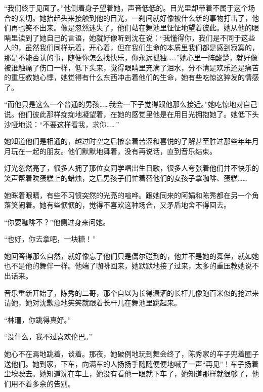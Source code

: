 \par “我们终于见面了。”他侧着身子望着她，声音低低的。目光里却带着不属于这个场合的亲切。她抬起头来接触到他的目光，一刹间就好像被什么新的事物打击了，他们再也笑不出来。像是忽然迷失了，他们站在舞池里怔怔地望着彼此。她从他的眼睛里读到了她自己的言语，她就好像听到沈在说：“我懂得你，我们是不同于这些人的，虽然我们同样玩着，开心着，但在我们生命的本质里我们都是感到寂寞的，那是不能否认的事，随便你怎么找快乐，你永远孤独……”她心里一阵酸楚，就好像被谁触痛了伤口一样，低下头来，觉得眼睛里充满了泪水，分不清是欢乐还是痛苦的重压教她心悸，她觉得有什么东西冲击着他们的生命，她有些吃惊这猝发的情感了。
\par “而他只是这么一个普通的男孩……我会一下子觉得跟他那么接近。”她吃惊地对自己说。他们彼此那样痴痴地凝望着，在她的感觉里他是在用目光拥抱她了。她低下头沙哑地说：“不要这样看我，求你……”
\par 她知道他们是相通的，越过时空之后掺杂着苦涩和喜悦的了解甚至胜过那些年年月月玩在一起的朋友。他们默默地舞着，没有再说话，直到音乐结束。
\par 灯光忽然亮了，很多人拥了那位女同学唱出生日歌，很多人夸张着他们并不快乐的笑声帮着吹蛋糕上的蜡烛，之后男孩子们忙着替他们的女孩子拿咖啡、蛋糕……
\par 她眯着眼睛，有些不习惯突然的光亮的喧哗。跟她同来的阿娟和陈秀都在另一个角落笑闹着。她有些恹恹的，觉得不喜欢这种场合，又矛盾地舍不得回去。
\par “你要咖啡不？”他侧过身来问她。
\par “也好，你去拿吧，一块糖！”
\par 她回答得那么自然，就好像忘了他们只是偶尔碰到的，他并不是她的舞伴，就如她也不是他的舞伴一样。他端了咖啡回来，她默默地接了过来，太多的重压教她说不出话来。
\par 音乐重新开始了，陈秀的二哥，那个自以为长得潇洒的长杆儿像跑百米似的抢过来请她，她对沈歉意地笑笑就跟着长杆儿在舞池里跳起来。
\par “林珊，你跳得真好。”
\par “没什么，我不过喜欢伦巴。”
\par 她心不在焉地跳着，谈着。那夜，她破例地玩到舞会终了，陈秀家的车子兜着圈子送他们。她到家，下车，向满车的人扬扬手随随便便地喊了一声“再见”！车子扬着尘埃驶去。她知道沈在车上，她没有看他一眼就下车了，她知道那样就很够了，他们用不着多余的告别。



